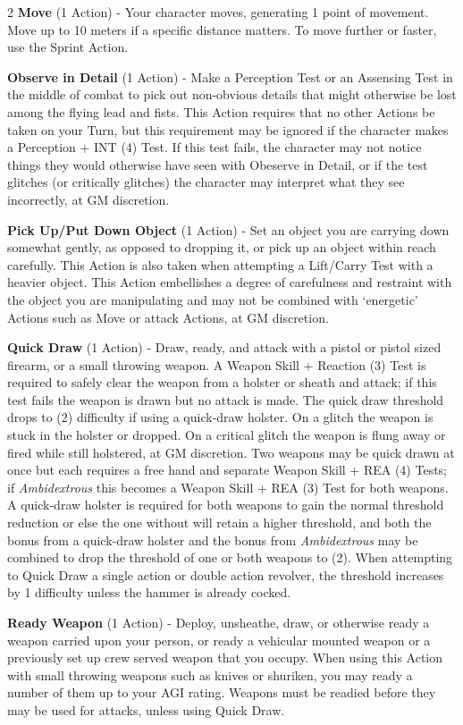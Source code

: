 \documentclass[
  oneside]{article}
\begin{document}
\begin{multicols}{2}
\textbf{Move} (1 Action) - Your character moves,
generating 1 point of movement. Move up to 10
meters if a specific distance matters. To move
further or faster, use the Sprint Action.

\textbf{Observe in Detail} (1 Action) - Make a
Perception Test or an Assensing Test in the middle
of combat to pick out non-obvious details that
might otherwise be lost among the flying lead and
fists. This Action requires that no other Actions
be taken on your Turn, but this requirement may be
ignored if the character makes a Perception + INT
(4) Test. If this test fails, the character may
not notice things they would otherwise have seen
with Obeserve in Detail, or if the test glitches
(or critically glitches) the character may
interpret what they see incorrectly, at GM
discretion.

\textbf{Pick Up/Put Down Object} (1 Action) - Set
an object you are carrying down somewhat gently,
as opposed to dropping it, or pick up an object
within reach carefully. This Action is also taken
when attempting a Lift/Carry Test with a heavier
object. This Action embellishes a degree of
carefulness and restraint with the object you are
manipulating and may not be combined with
`energetic' Actions such as Move or attack
Actions, at GM discretion.

\textbf{Quick Draw} (1 Action) - Draw, ready, and
attack with a pistol or pistol sized firearm, or a
small throwing weapon. A Weapon Skill + Reaction
(3) Test is required to safely clear the weapon
from a holster or sheath and attack; if this test
fails the weapon is drawn but no attack is made.
The quick draw threshold drops to (2) difficulty
if using a quick-draw holster. On a glitch the
weapon is stuck in the holster or dropped. On a
critical glitch the weapon is flung away or fired
while still holstered, at GM discretion. Two
weapons may be quick drawn at once but each
requires a free hand and separate Weapon Skill +
REA (4) Tests; if \emph{Ambidextrous} this becomes
a Weapon Skill + REA (3) Test for both weapons. A
quick-draw holster is required for both weapons to
gain the normal threshold reduction or else the
one without will retain a higher threshold, and
both the bonus from a quick-draw holster and the
bonus from \emph{Ambidextrous} may be combined to
drop the threshold of one or both weapons to (2).
When attempting to Quick Draw a single action or
double action revolver, the threshold increases by
1 difficulty unless the hammer is already cocked.

\textbf{Ready Weapon} (1 Action) - Deploy,
unsheathe, draw, or otherwise ready a weapon
carried upon your person, or ready a vehicular
mounted weapon or a previously set up crew served
weapon that you occupy. When using this Action
with small throwing weapons such as knives or
shuriken, you may ready a number of them up to
your AGI rating. Weapons must be readied before
they may be used for attacks, unless using Quick
Draw.


\end{multicols}
\end{document}
